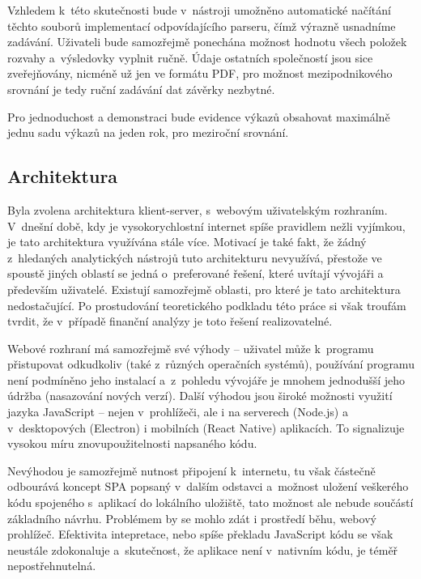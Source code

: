 Vzhledem k~této skutečnosti bude v~nástroji umožněno automatické načítání těchto souborů implementací odpovídajícího parseru, čímž výrazně usnadníme zadávání. Uživateli bude samozřejmě ponechána možnost hodnotu všech položek rozvahy a~výsledovky vyplnit ručně. Údaje ostatních společností jsou sice zveřejňovány, nicméně už jen ve formátu PDF, pro možnost mezipodnikového srovnání je tedy ruční zadávání dat závěrky nezbytné.

Pro jednoduchost a demonstraci bude evidence výkazů obsahovat maximálně jednu sadu výkazů na jeden rok, pro meziroční srovnání.



\subsection{Architektura}
Byla zvolena architektura klient-server, s~webovým uživatelským rozhraním. V~dnešní době, kdy je vysokorychlostní internet spíše pravidlem nežli vyjímkou, je tato architektura využívána stále více. Motivací je také fakt, že žádný z~hledaných analytických nástrojů tuto architekturu nevyužívá, přestože ve spoustě jiných oblastí se jedná o~preferované řešení, které uvítají vývojáři a především uživatelé. Existují samozřejmě oblasti, pro které je tato architektura nedostačující. Po prostudování teoretického podkladu této práce si však troufám tvrdit, že v~případě finanční analýzy je toto řešení realizovatelné. 

Webové rozhraní má samozřejmě své výhody -- uživatel může k~programu přistupovat odkudkoliv (také z~různých operačních systémů), používání programu není podmíněno jeho instalací a~z~pohledu vývojáře je mnohem jednodušší jeho údržba (nasazování nových verzí). Další výhodou jsou široké možnosti využití jazyka JavaScript -- nejen v~prohlížeči, ale i na serverech (Node.js) a v~desktopových (Electron) i mobilních (React Native) aplikacích. To signalizuje vysokou míru znovupoužitelnosti napsaného kódu. 

Nevýhodou je samozřejmě nutnost připojení k~internetu, tu však částečně odbourává koncept SPA popsaný v~dalším odstavci a~možnost uložení veškerého kódu spojeného s~aplikací do lokálního uložiště, tato možnost ale nebude součástí základního návrhu. Problémem by se mohlo zdát i prostředí běhu, webový prohlížeč. Efektivita intepretace, nebo spíše překladu JavaScript kódu se však neustále zdokonaluje a~skutečnost, že aplikace není v~nativním kódu, je téměř nepostřehnutelná. 

